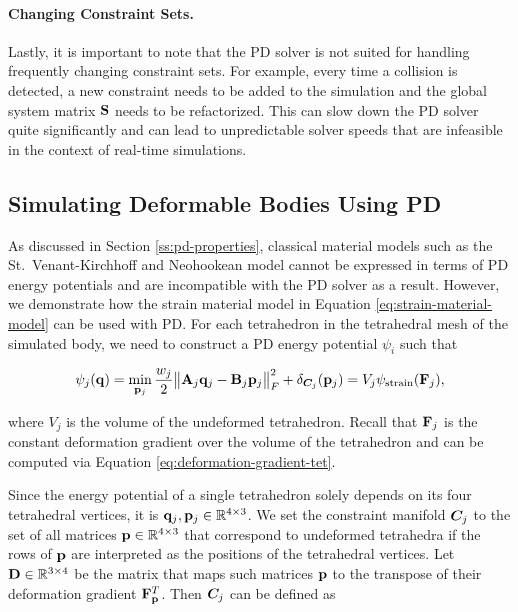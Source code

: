 \paragraph{Changing Constraint Sets.}
Lastly, it is important to note that the PD solver is not suited for handling frequently changing constraint sets. For example, every time 
a collision is detected, a new constraint needs to be added to the simulation and the global system matrix $\mathbf{S}$ needs
to be refactorized. This can slow down the PD solver quite significantly and can lead to unpredictable solver speeds that are infeasible in the
context of real-time simulations.

\subsection{Simulating Deformable Bodies Using PD}\label{ss:pd-deformable-bodies}
As discussed in Section \ref{ss:pd-properties}, classical material models such as the St.\ Venant-Kirchhoff and Neohookean model cannot be expressed in 
terms of PD energy potentials and are incompatible with the PD solver as a result. However, we demonstrate how the strain material model in 
Equation \ref{eq:strain-material-model} can be used with PD. For each tetrahedron in the tetrahedral mesh of the simulated body, we need to 
construct a PD energy potential $\psi_i$ such that 

\[
    \psi_j(\mathbf{q}) = \min_{\mathbf{p}_j} \frac{w_j}{2} \norm{\mathbf{A}_j\mathbf{q}_j - \mathbf{B}_j\mathbf{p}_j}^2_F + \delta_{\bm{C}_j}(\mathbf{p}_j)
    = V_j\psi_{\text{strain}}(\mathbf{F}_j),
\]

\noindent where $V_j$ is the volume of the undeformed tetrahedron. Recall that $\mathbf{F}_j$ is the constant deformation gradient over the volume 
of the tetrahedron and can be computed via Equation \ref{eq:deformation-gradient-tet}. 

Since the energy potential of a single tetrahedron solely depends on its four tetrahedral vertices, it 
is $\mathbf{q}_j, \mathbf{p}_j \in \mathbb{R}^{4 \times 3}$. We set the constraint manifold $\bm{C}_j$ to the set of all matrices $\mathbf{p} 
\in \mathbb{R}^{4 \times 3}$ that correspond to undeformed tetrahedra if the rows of $\mathbf{p}$ are interpreted as the positions of the 
tetrahedral vertices. Let $\mathbf{D} \in \mathbb{R}^{3 \times 4}$ be the matrix that maps such matrices $\mathbf{p}$ to the transpose of their deformation 
gradient $\mathbf{F}_\mathbf{p}^T$. Then $\bm{C}_j$ can be defined as


